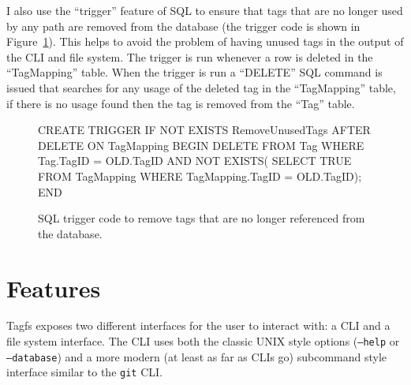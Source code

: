 I also use the ``trigger'' feature of SQL to ensure that tags that are no
longer used by any path are removed from the database (the trigger code is
shown in Figure~\ref{fig:sql-trigger}). This helps to avoid the problem of
having unused tags in the output of the CLI and file system. The trigger is run
whenever a row is deleted in the ``TagMapping'' table. When the trigger is run
a ``DELETE'' SQL command is issued that searches for any usage of the deleted
tag in the ``TagMapping'' table, if there is no usage found then the tag is
removed from the ``Tag'' table.

\begin{figure}[h]
    \centering
    \begin{boxedverbatim}

CREATE TRIGGER IF NOT EXISTS
RemoveUnusedTags AFTER DELETE ON TagMapping
BEGIN
  DELETE FROM Tag
  WHERE
    Tag.TagID = OLD.TagID
    AND NOT EXISTS(
      SELECT TRUE
      FROM TagMapping
      WHERE TagMapping.TagID = OLD.TagID);
END
    \end{boxedverbatim}
    \caption[SQL Trigger Code]{SQL trigger code to remove tags that are no
    longer referenced from the database.}
    \label{fig:sql-trigger}
\end{figure}


\section{Features}
\label{section:features}

Tagfs exposes two different interfaces for the user to interact with: a CLI and
a file system interface. The CLI uses both the classic UNIX style options
(\texttt{--help} or \texttt{--database}) and a more modern (at least as far as
CLIs go) subcommand style interface similar to the \texttt{git} CLI.

